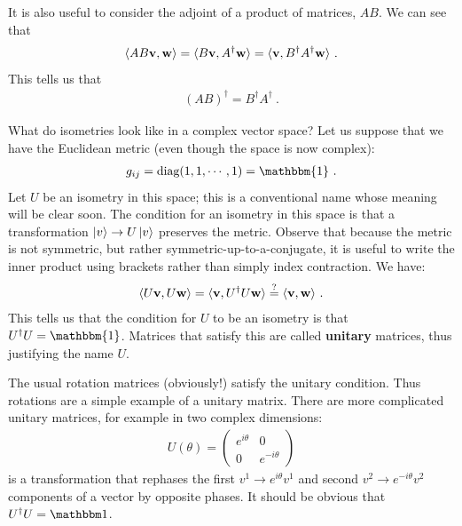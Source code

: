 \documentclass[12pt]{article}
\begin{document}
It is also useful to consider the adjoint of a product of matrices, $AB$. We can see that
\begin{align}
    \langle AB \mathbf{v}, \mathbf{w} \rangle
    =
    \langle B \mathbf{v},  A^\dag \mathbf{w} \rangle
    =
    \langle \mathbf{v}, B^\dag A^\dag \mathbf{w} \rangle \ .
\end{align}
This tells us that
\begin{align}
    (AB)^\dag = B^\dag A^\dag \ .
    \label{eq:adjoint:of:product}
\end{align}



\begin{example} What do isometries look like in a complex vector space? Let us suppose that we have the Euclidean metric (even though the space is now complex):
\begin{align}
    g_{ij} = \text{diag}(1,1,\cdots, 1) = \mathbbm{1} \ .
\end{align}
Let $U$ be an isometry in this space; this is a conventional name whose meaning will be clear soon. The condition for an isometry in this space is that a transformation $\left|v\right\rangle \to U\left|v\right\rangle$ preserves the metric. Observe that because the metric is not symmetric, but rather symmetric-up-to-a-conjugate, it is useful to write the inner product using brackets rather than simply index contraction. We have:
\begin{align}
    \langle U\mathbf{v}, U\mathbf{w} \rangle = \langle \mathbf{v}, U^\dag U \mathbf{w} \rangle \stackrel{?}{=} \langle \mathbf{v}, \mathbf{w} \rangle \ .
\end{align}
This tells us that the condition for $U$ to be an isometry is that $U^\dag U = \mathbbm{1}$. Matrices that satisfy this are called \textbf{unitary} matrices, thus justifying the name $U$. 
\end{example}

\begin{example}
The usual rotation matrices (obviously!) satisfy the unitary condition. Thus rotations are a simple example of a unitary matrix. There are more complicated unitary matrices, for example in two complex dimensions:
\begin{align}
    U(\theta) = 
    \begin{pmatrix}
        e^{i\theta} & 0\\
        0 & e^{-i\theta}
    \end{pmatrix}
    \label{eg:unitary:matrix:diagonal}
\end{align}
is a transformation that rephases the first $v^1 \to e^{i\theta}v^1$  and second $v^2 \to e^{-i\theta}v^2$ components of a vector by opposite phases. It should be obvious that $U^\dag U = \one$. 
\end{example}
\end{document}
